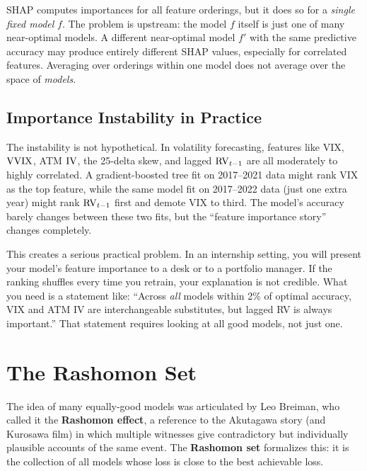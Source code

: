 \begin{intuition}
SHAP computes importances for all feature orderings, but it does so for
a \emph{single fixed model} $f$.  The problem is upstream: the model $f$
itself is just one of many near-optimal models.  A different near-optimal
model $f'$ with the same predictive accuracy may produce entirely different
SHAP values, especially for correlated features.  Averaging over orderings
within one model does not average over the space of \emph{models}.
\end{intuition}

\subsection{Importance Instability in Practice}

The instability is not hypothetical.  In volatility forecasting, features
like VIX, $\operatorname{VVIX}$, ATM $\operatorname{IV}$, the 25-delta skew, and lagged $\operatorname{RV}_{t-1}$
are all moderately to highly correlated.  A gradient-boosted tree fit on
2017--2021 data might rank VIX as the top feature, while the same model fit on
2017--2022 data (just one extra year) might rank $\operatorname{RV}_{t-1}$ first and
demote VIX to third.  The model's accuracy barely changes between these two
fits, but the ``feature importance story'' changes completely.

This creates a serious practical problem.  In an internship setting, you will
present your model's feature importance to a desk or to a portfolio manager.
If the ranking shuffles every time you retrain, your explanation is not
credible.  What you need is a statement like: ``Across \emph{all} models
within 2\% of optimal accuracy, VIX and ATM IV are interchangeable
substitutes, but lagged RV is always important.''  That statement requires
looking at all good models, not just one.


\section{The Rashomon Set}\label{sec:rashomon:set}

The idea of many equally-good models was articulated by Leo Breiman, who
called it the \textbf{Rashomon effect}, a reference to the Akutagawa story
(and Kurosawa film) in which multiple witnesses give contradictory but
individually plausible accounts of the same event.  The \textbf{Rashomon set}
formalizes this: it is the collection of all models whose loss is close to
the best achievable loss.


